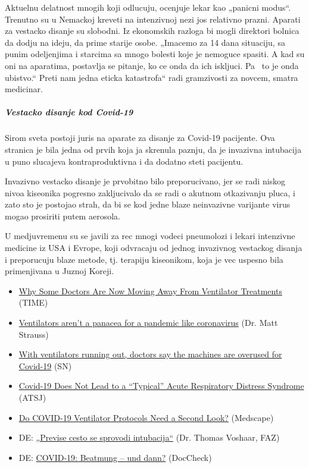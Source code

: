 Aktuelnu delatnost mnogih koji odlucuju, ocenjuje lekar kao „panicni
modus``. Trenutno su u Nemackoj kreveti na intenzivnoj nezi jos
relativno prazni. Aparati za vestacko disanje su slobodni. Iz ekonomskih
razloga bi mogli direktori bolnica da dodju na ideju, da prime starije
osobe. „Imacemo za 14 dana situaciju, sa punim odeljenjima i starcima sa
mnogo bolesti koje je nemoguce spasiti. A kad su oni na aparatima,
postavlja se pitanje, ko ce onda da ich iskljuci. Pa ~to je onda
ubistvo.`` Preti nam jedna eticka katastrofa`` radi gramzivosti za
novcem, smatra medicinar.

\hypertarget{vestacko-disanje-kod-covid-19-1}{%
\subparagraph{\texorpdfstring{\textbf{Vestacko disanje kod
Covid-19}}{Vestacko disanje kod Covid-19}}\label{vestacko-disanje-kod-covid-19-1}}

Sirom sveta postoji juris na aparate za disanje za Covid-19 pacijente.
Ova stranica je bila jedna od prvih koja ja skrenula paznju, da je
invazivna intubacija u puno slucajeva kontraproduktivna i da dodatno
steti pacijentu.

Invazivno vestacko disanje je prvobitno bilo preporucivano, jer se radi
niskog nivoa kiseonika pogresno zakljucivalo da se radi o akutnom
otkazivanju pluca, i zato sto je postojao strah, da bi se kod jedne
blaze neinvazivne varijante virus mogao prosiriti putem aerosola.

U medjuvremenu su se javili za rec mnogi vodeci pneumolozi i lekari
intenzivne medicine iz USA i Evrope, koji odvracaju od jednog invazivnog
vestackog disanja i preporucuju blaze metode, tj. terapiju kiseonikom,
koja je vec uspesno bila primenjivana u Juznoj Koreji.

\begin{itemize}
\tightlist
\item
  \href{https://time.com/5818547/ventilators-coronavirus/}{Why Some
  Doctors Are Now Moving Away From Ventilator Treatments} (TIME)
\item
  \href{https://www.spectator.co.uk/article/Ventilators-aren-t-a-panacea-for-a-pandemic-like-coronavirus}{Ventilators
  aren't a panacea for a pandemic like coronavirus} (Dr. Matt Strauss)
\item
  \href{https://www.statnews.com/2020/04/08/doctors-say-ventilators-overused-for-covid-19/}{With
  ventilators running out, doctors say the machines are overused for
  Covid-19} (SN)
\item
  \href{https://www.atsjournals.org/doi/pdf/10.1164/rccm.202003-0817LE}{Covid-19
  Does Not Lead to a ``Typical'' Acute Respiratory Distress Syndrome}
  (ATSJ)
\item
  \href{https://www.medscape.com/viewarticle/928156}{Do COVID-19
  Ventilator Protocols Need a Second Look?} (Medscape)
\item
  DE: \href{https://archive.is/KX5IQ}{„Previse cesto se sprovodi
  intubacija``} (Dr. Thomas Voshaar, FAZ)
\item
  DE:
  \href{https://www.doccheck.com/de/detail/articles/26271-covid-19-beatmung-und-dann}{COVID-19:
  Beatmung -- und dann?} (DocCheck)
\end{itemize}

